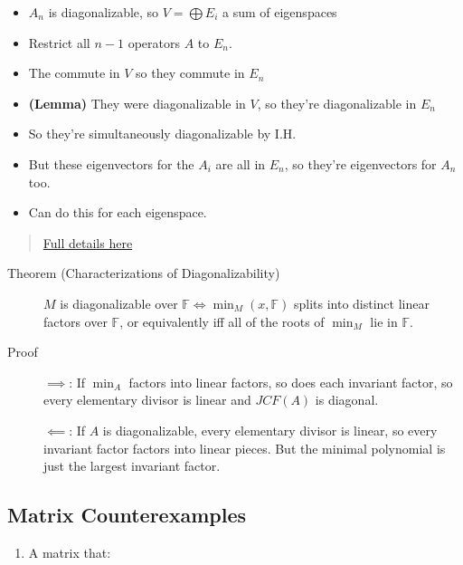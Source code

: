 \begin{description}
\begin{itemize}
\tightlist
\item
  \(A_n\) is diagonalizable, so \(V = \bigoplus E_i\) a sum of
  eigenspaces
\item
  Restrict all \(n-1\) operators \(A\) to \(E_n\).
\item
  The commute in \(V\) so they commute in \(E_n\)
\item
  \textbf{(Lemma)} They were diagonalizable in \(V\), so they're
  diagonalizable in \(E_n\)
\item
  So they're simultaneously diagonalizable by I.H.
\item
  But these eigenvectors for the \(A_i\) are all in \(E_n\), so they're
  eigenvectors for \(A_n\) too.
\item
  Can do this for each eigenspace.
\end{itemize}
\end{description}

\begin{quote}
\href{https://kconrad.math.uconn.edu/blurbs/linmultialg/minpolyandappns.pdf\#page=9}{Full
details here}
\end{quote}

\begin{description}
\item[Theorem (Characterizations of Diagonalizability)]
\(M\) is diagonalizable over
\({\mathbb{F}}\iff \min_M(x, {\mathbb{F}})\) splits into distinct linear
factors over \({\mathbb{F}}\), or equivalently iff all of the roots of
\(\min_M\) lie in \({\mathbb{F}}\).
\item[Proof]
\(\implies\): If \(\min_A\) factors into linear factors, so does each
invariant factor, so every elementary divisor is linear and \(JCF(A)\)
is diagonal.

\(\impliedby\): If \(A\) is diagonalizable, every elementary divisor is
linear, so every invariant factor factors into linear pieces. But the
minimal polynomial is just the largest invariant factor.
\end{description}

\hypertarget{matrix-counterexamples}{%
\subsection{Matrix Counterexamples}\label{matrix-counterexamples}}

\begin{enumerate}
\def\labelenumi{\arabic{enumi}.}
\tightlist
\item
  A matrix that:
\end{enumerate}

